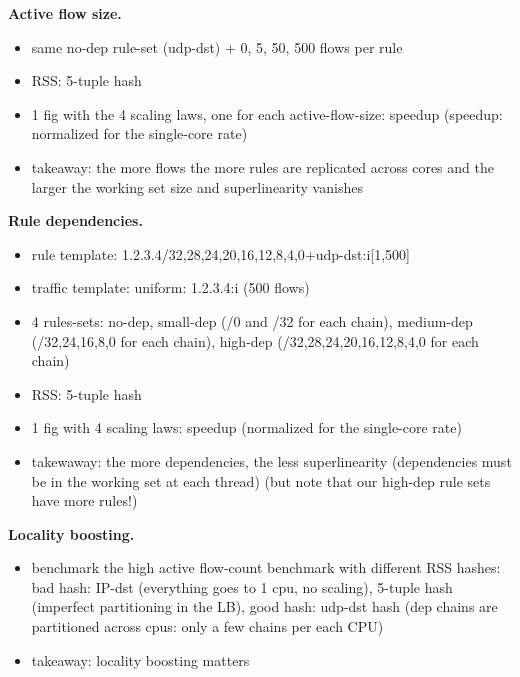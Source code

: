 \noindent
\textbf{Active flow size.} %
\begin{itemize}
\item same no-dep rule-set (udp-dst) + 0, 5, 50, 500 flows per rule
\item RSS: 5-tuple hash
\item 1 fig with the 4 scaling laws, one for each active-flow-size: speedup (speedup: normalized for the single-core rate)
\item takeaway: the more flows the more rules are replicated across cores and the larger the working set size and superlinearity vanishes
\end{itemize}

\noindent%
\textbf{Rule dependencies.} %
\begin{itemize}
\item rule template: 1.2.3.4/{32,28,24,20,16,12,8,4,0}+udp-dst:i[1,500]
\item traffic template: uniform: 1.2.3.4:i (500 flows) 
\item 4 rules-sets: no-dep, small-dep (/0 and /32 for each chain), medium-dep (/{32,24,16,8,0} for each chain), high-dep (/{32,28,24,20,16,12,8,4,0} for each chain)
\item RSS: 5-tuple hash
\item 1 fig with 4 scaling laws: speedup (normalized for the single-core rate)
\item takewaway: the more dependencies, the less superlinearity (dependencies must be in the working set at each thread) (but note that our high-dep rule sets have more rules!)
\end{itemize}

\noindent%
\textbf{Locality boosting.} %
\begin{itemize}
\item benchmark the high active flow-count benchmark with different RSS hashes: bad hash: IP-dst (everything goes to 1 cpu, no scaling), 5-tuple hash (imperfect partitioning in the LB), good hash: udp-dst hash (dep chains are partitioned across cpus: only a few chains per each CPU) 
\item takeaway: locality boosting matters
\end{itemize}


